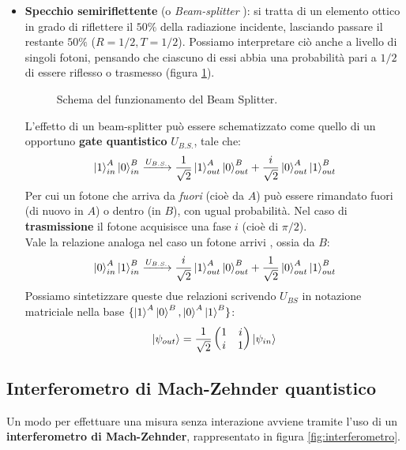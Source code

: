 \documentclass[../../InformazioneQuantistica.tex]{subfiles}
\begin{document}
\begin{itemize}
\item \textbf{Specchio semiriflettente} (o \textit{Beam-splitter} \cite{beam-splitter}): si tratta di un elemento ottico in grado di riflettere il $50\%$ della radiazione incidente, lasciando passare il restante $50\%$ ($R=1/2, T=1/2$). Possiamo interpretare ciò anche a livello di singoli fotoni, pensando che ciascuno di essi abbia una probabilità pari a $1/2$ di essere riflesso o trasmesso (figura \ref{fig:beam-splitter}).
\begin{figure}[H]
\centering

\caption{Schema del funzionamento del Beam Splitter.
\label{fig:beam-splitter}}
\end{figure}
L'effetto di un beam-splitter può essere schematizzato come quello di un opportuno \textbf{gate quantistico} $U_{B.S.}$, tale che:
\begin{align*}
\Ket{1}^A_{in}\Ket{0}^B_{in} \xrightarrow{U_{B.S.}} \frac{1}{\sqrt{2}}\Ket{1}^A_{out} \Ket{0}^B_{out} + \frac{i}{\sqrt{2}}\Ket{0}^A_{out}\Ket{1}^B_{out}
\end{align*}
Per cui un fotone che arriva da \textit{fuori} (cioè da $A$) può essere rimandato fuori (di nuovo in $A$) o dentro (in $B$), con ugual probabilità. Nel caso di \textbf{trasmissione} il fotone acquisisce una fase $i$ (cioè di $\pi/2$).\\
Vale la relazione analoga nel caso un fotone arrivi , ossia da $B$:
\begin{align*}
\Ket{0}^A_{in}\Ket{1}^B_{in} \xrightarrow{U_{B.S.}} \frac{i}{\sqrt{2}}\Ket{1}^A_{out}\Ket{0}^B_{out} + \frac{1}{\sqrt{2}}\Ket{0}^A_{out}\Ket{1}^B_{out}
\end{align*}
Possiamo sintetizzare queste due relazioni scrivendo $U_{BS}$ in notazione matriciale nella base $\{\Ket{1}^A \Ket{0}^B, \Ket{0}^A \Ket{1}^B \}$:
\begin{align*}
\Ket{\psi_{out}} = \frac{1}{\sqrt{2}}\begin{pmatrix}1 & i\\i & 1\end{pmatrix}\Ket{\psi_{in}}
\end{align*}
\end{itemize}

\subsection{Interferometro di Mach-Zehnder quantistico}
Un modo per effettuare una misura senza interazione avviene tramite l'uso di un \textbf{interferometro di Mach-Zehnder}, rappresentato in figura \ref{fig:interferometro}.
\end{document}
